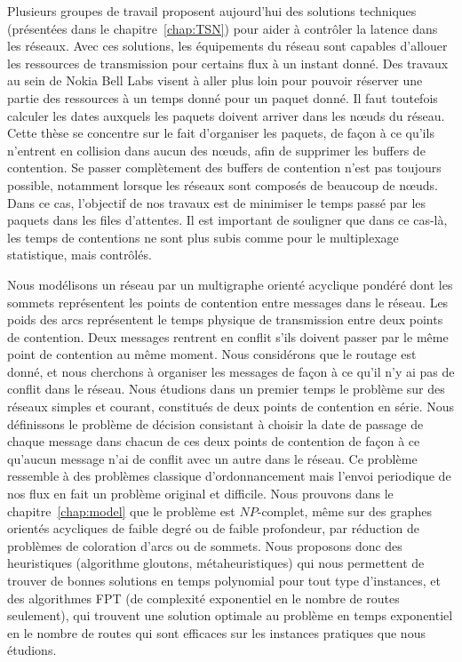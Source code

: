 Plusieurs groupes de travail proposent aujourd'hui des solutions techniques (présentées dans le chapitre~\ref{chap:TSN}) pour aider à contrôler la latence dans les réseaux. Avec ces solutions, les équipements du réseau sont capables d'allouer les ressources de transmission pour certains flux à un instant donné. Des travaux au sein de Nokia Bell Labs visent à aller plus loin pour pouvoir réserver une partie des ressources à un temps donné pour un paquet donné. Il faut toutefois calculer les dates auxquels les paquets doivent arriver dans les nœuds du réseau. Cette thèse se concentre sur le fait d'organiser les paquets, de façon à ce qu'ils n'entrent en collision dans aucun des nœuds, afin de supprimer les buffers de contention. Se passer complètement des buffers de contention n'est pas toujours possible, notamment lorsque les réseaux sont composés de beaucoup de nœuds. Dans ce cas, l'objectif de nos travaux est de minimiser le temps passé par les paquets dans les files d'attentes. Il est important de souligner que dans ce cas-là, les temps de contentions ne sont plus subis comme pour le multiplexage statistique, mais contrôlés.

Nous modélisons un réseau par un multigraphe orienté acyclique pondéré dont les sommets représentent les points de contention entre messages dans le réseau. Les poids des arcs représentent le temps physique de transmission entre deux points de contention. Deux messages rentrent en conflit s’ils doivent passer par le même point de contention au même moment. Nous considérons que le routage est donné, et nous cherchons à organiser les messages de façon à ce qu'il n'y ai pas de conflit dans le réseau. Nous étudions dans un premier temps le problème sur des réseaux simples et courant, constitués de deux points de contention en série. 
Nous définissons le problème de décision consistant à choisir la date de passage de chaque message dans chacun de ces deux points de contention de façon à ce qu'aucun message n'ai de conflit avec un autre dans le réseau. Ce problème ressemble à des problèmes classique d'ordonnancement mais l'envoi periodique de nos flux en fait un problème original et difficile. Nous prouvons dans le chapitre~\ref{chap:model} que le problème est $NP$-complet, même sur des graphes orientés acycliques de faible degré ou de faible profondeur, par réduction de problèmes de coloration d'arcs ou de sommets. Nous proposons donc des heuristiques (algorithme gloutons, métaheuristiques) qui nous permettent de trouver de bonnes solutions en temps polynomial pour tout type d'instances, et des algorithmes FPT (de complexité exponentiel en le nombre de routes seulement), qui trouvent une solution optimale au problème en temps exponentiel en le nombre de routes qui sont efficaces sur les instances pratiques que nous étudions.


